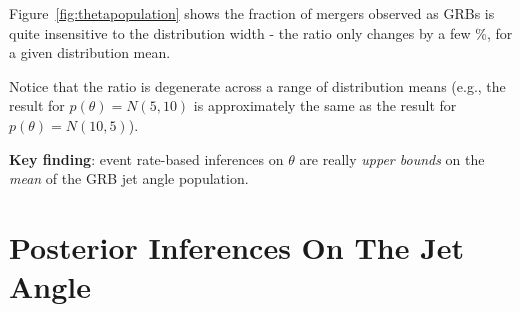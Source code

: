 \documentclass[a0,landscape]{a0poster}
\begin{document}
\begin{multicols}{4}

Figure~\ref{fig:thetapopulation} shows the fraction of mergers observed as GRBs
is quite insensitive to the distribution width - the ratio only changes by a
few \%, for a given distribution mean.
 
Notice that the ratio is degenerate across a range of distribution means (e.g.,
the result for $p(\theta) = N(5,10)$ is approximately the same as the result for
$p(\theta) = N(10,5)$).  

{\bf Key finding}: event rate-based inferences on $\theta$ are really \emph{upper
bounds} on the \emph{mean} of the GRB jet angle population.



\section*{\centering Posterior Inferences On The Jet Angle}


\end{multicols}
\end{document}
